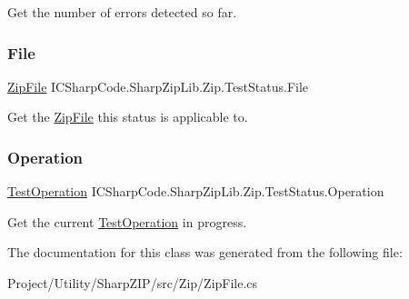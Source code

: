 Get the number of errors detected so far. 

\mbox{\label{class_i_c_sharp_code_1_1_sharp_zip_lib_1_1_zip_1_1_test_status_a037289f000b4315b78ac78f42faefad2}} 
\subsubsection{\texorpdfstring{File}{File}}
{\footnotesize\ttfamily \hyperlink{class_i_c_sharp_code_1_1_sharp_zip_lib_1_1_zip_1_1_zip_file}{Zip\+File} I\+C\+Sharp\+Code.\+Sharp\+Zip\+Lib.\+Zip.\+Test\+Status.\+File\hspace{0.3cm}{\ttfamily [get]}}



Get the \hyperlink{class_i_c_sharp_code_1_1_sharp_zip_lib_1_1_zip_1_1_zip_file}{Zip\+File} this status is applicable to. 

\mbox{\label{class_i_c_sharp_code_1_1_sharp_zip_lib_1_1_zip_1_1_test_status_ac8a7bd5c3f195f8e9d9f8584243bbe8b}} 
\subsubsection{\texorpdfstring{Operation}{Operation}}
{\footnotesize\ttfamily \hyperlink{namespace_i_c_sharp_code_1_1_sharp_zip_lib_1_1_zip_ac2c93a91b7fd0e8c82d654452f736726}{Test\+Operation} I\+C\+Sharp\+Code.\+Sharp\+Zip\+Lib.\+Zip.\+Test\+Status.\+Operation\hspace{0.3cm}{\ttfamily [get]}}



Get the current \hyperlink{namespace_i_c_sharp_code_1_1_sharp_zip_lib_1_1_zip_ac2c93a91b7fd0e8c82d654452f736726}{Test\+Operation} in progress. 



The documentation for this class was generated from the following file\+:\begin{DoxyCompactItemize}
\item 
Project/\+Utility/\+Sharp\+Z\+I\+P/src/\+Zip/Zip\+File.\+cs\end{DoxyCompactItemize}
